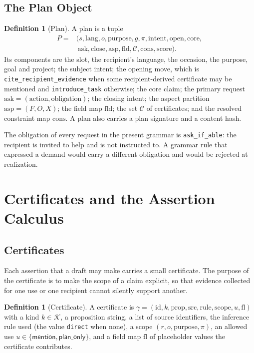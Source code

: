 \documentclass[11pt]{article}
\theoremstyle{definition}
\newtheorem{definition}[theorem]{Definition}
\theoremstyle{remark}
\newcommand{\mention}{\mathsf{mention}}
\newcommand{\planonly}{\mathsf{plan\_only}}
\newcommand{\code}[1]{\texttt{#1}}
\begin{document}
\subsection{The Plan Object}

\begin{definition}[Plan]\label{def:plan}
A plan is a tuple
\[
\begin{aligned}P={}&(s,\mathrm{lang},o,\mathrm{purpose},g,\pi,\mathrm{intent},\mathrm{open},\mathrm{core},\\&\ \mathrm{ask},\mathrm{close},\mathrm{asp},\mathrm{fld},\mathcal{C},\mathrm{cons},\mathrm{score}).\end{aligned}
\]
 Its components are the slot, the recipient's language, the occasion, the purpose, goal and project; the subject intent; the opening move, which is \code{cite\_recipient\_evidence} when some recipient-derived certificate may be mentioned and \code{introduce\_task} otherwise; the core claim; the primary request $\mathrm{ask}=(\mathrm{action},\mathrm{obligation})$; the closing intent; the aspect partition $\mathrm{asp}=(F,O,X)$; the field map $\mathrm{fld}$; the set $\mathcal{C}$ of certificates; and the resolved constraint map $\mathrm{cons}$. A plan also carries a plan signature and a content hash.
\end{definition}

The obligation of every request in the present grammar is \code{ask\_if\_able}: the recipient is invited to help and is not instructed to. A grammar rule that expressed a demand would carry a different obligation and would be rejected at realization.
\section{Certificates and the Assertion Calculus}\label{sec:cert}

\subsection{Certificates}

Each assertion that a draft may make carries a small certificate. The purpose of the certificate is to make the scope of a claim explicit, so that evidence collected for one use or one recipient cannot silently support another.

\begin{definition}[Certificate]\label{def:cert}
A certificate is $\gamma=(\mathrm{id},k,\mathrm{prop},\mathrm{src},\mathrm{rule},\mathrm{scope},u,\mathrm{fl})$ with a kind $k\in\mathcal{K}$, a proposition string, a list of source identifiers, the inference rule used (the value \code{direct} when none), a scope $(r,o,\mathrm{purpose},\pi)$, an allowed use $u\in\{\mention,\planonly\}$, and a field map $\mathrm{fl}$ of placeholder values the certificate contributes.
\end{definition}
\end{document}
